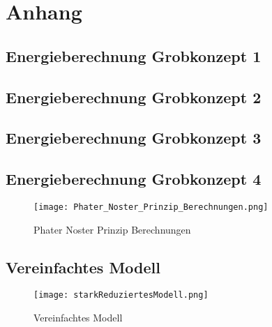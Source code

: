 \section{Anhang} \label{sec:anhang}

\subsection{Energieberechnung Grobkonzept 1} \label{subsec:grobkonzept1}

\subsection{Energieberechnung Grobkonzept 2} \label{subsec:grobkonzept2}

\subsection{Energieberechnung Grobkonzept 3} \label{subsec:grobkonzept3}

\subsection{Energieberechnung Grobkonzept 4} \label{subsec:grobkonzept4}
\begin{figure} [H]
	\centering
	\texttt{[image: Phater\_Noster\_Prinzip\_Berechnungen.png]}
	\caption{Phater Noster Prinzip Berechnungen}
	\label{fig:Phater_Noster_Prinzip_Berechnungen}

\end{figure}

\subsection{Vereinfachtes Modell} \label{subsec:vereinfachtesModel}
\begin{figure} [H]
	\centering
	\texttt{[image: starkReduziertesModell.png]}
	\caption{Vereinfachtes Modell}
	\label{fig:VereinfachtesModel}
\end{figure}
